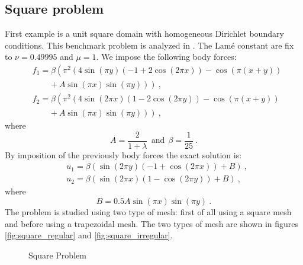\documentclass[preprint,12pt,authoryear]{elsarticle}
\begin{document}
\subsection{Square problem}
First example is a unit square domain with homogeneous Dirichlet boundary conditions. This benchmark problem is analyzed in \cite{brenner}.
The Lamé constant are fix to $\nu=0.49995$ and $\mu=1$.
We impose the following body forces:
\begin{equation}
\begin{split}
&f_{1} = \beta \left(\pi^{2} \left(4\sin\left(\pi y\right)
\left(-1+2\cos\left(2\pi x\right)\right)
-\cos\left(\pi\left(x+y\right)\right) \right.\right. \\
&\left.\left. \hspace{24pt} + A\sin\left(\pi x\right)\sin\left(\pi y\right)\right)\right)\:, \\
&f_{2} = \beta \left(\pi^{2}\left(4\sin\left(2\pi x\right)
\left(1-2\cos\left(2\pi y\right)\right)
-\cos\left(\pi\left(x+y\right)\right)\right.\right. \\
&\left.\left. \hspace{24pt} + A\sin\left(\pi x\right)\sin\left(\pi y\right)\right)\right)\:,
\end{split}
\end{equation}
where
\begin{equation}
A=\frac{2}{1+\lambda} \:\: \mbox{and} \:\: \beta =\frac{1}{25}\:.
\end{equation}
By imposition of the previously body forces the exact solution is:
\begin{equation} \label{eq:exact_solution}
\begin{split}
&u_{1} = \beta\left(\sin\left(2\pi y\right)
\left(-1+\cos\left(2\pi x\right)\right)+B\right)\:, \\
&u_{2} = \beta\left(\sin\left(2\pi x\right)
\left(1-\cos\left(2\pi y\right)\right)+B\right)\:,
\end{split}
\end{equation} 
where 
\begin{equation}
B=0.5A\sin\left(\pi x\right)\sin\left(\pi y\right)\:.
\end{equation}
The problem is studied using two type of mesh: first of all using a square mesh and before using a trapezoidal mesh. The two types of mesh are shown in figures \ref{fig:square_regular} and \ref{fig:square_irregular}. 
%
\begin{figure}[h!]
\begin{center}
\hspace{5pt}
\caption{Square Problem}
\end{center}
\end{figure}
\end{document}
